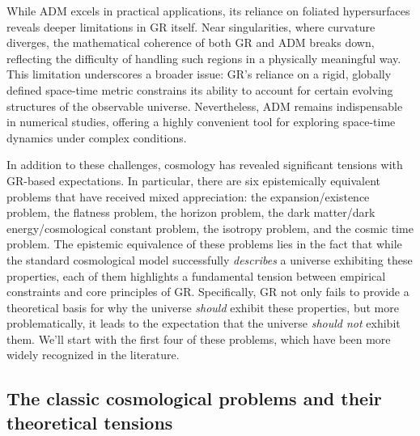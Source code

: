 \documentclass[aps,prd,reprint,superscriptaddress]{revtex4-2}
\begin{document}
While ADM excels in practical applications, its reliance on foliated hypersurfaces reveals deeper limitations in GR itself. Near singularities, where curvature diverges, the mathematical coherence of both GR and ADM breaks down, reflecting the difficulty of handling such regions in a physically meaningful way. This limitation underscores a broader issue: GR's reliance on a rigid, globally defined space-time metric constrains its ability to account for certain evolving structures of the observable universe. Nevertheless, ADM remains indispensable in numerical studies, offering a highly convenient tool for exploring space-time dynamics under complex conditions.

In addition to these challenges, cosmology has revealed significant tensions with GR-based expectations. In particular, there are six epistemically equivalent problems that have received mixed appreciation: the expansion/existence problem, the flatness problem, the horizon problem, the dark matter/dark energy/cosmological constant problem, the isotropy problem, and the cosmic time problem. The epistemic equivalence of these problems lies in the fact that while the standard cosmological model successfully \textit{describes} a universe exhibiting these properties, each of them highlights a fundamental tension between empirical constraints and core principles of GR. Specifically, GR not only fails to provide a theoretical basis for why the universe \textit{should} exhibit these properties, but more problematically, it leads to the expectation that the universe \textit{should not} exhibit them. We'll start with the first four of these problems, which have been more widely recognized in the literature.

\subsection{The classic cosmological problems and their theoretical tensions}
\end{document}
